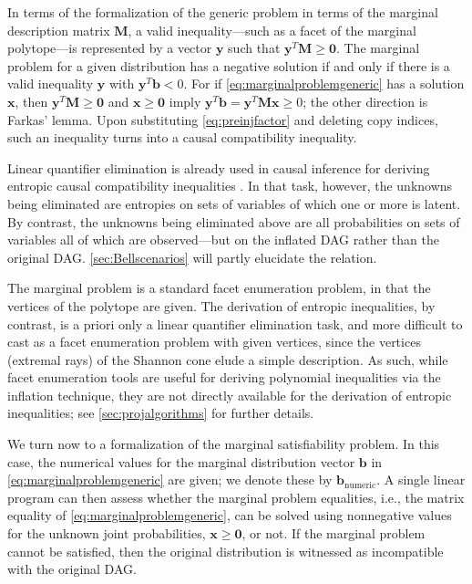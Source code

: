 \documentclass[aps,english,superscriptaddress,onecolumn,twoside,longbibliography,pra,floatfix,fleqn,nofootinbib]{revtex4-1}%
\theoremstyle{definition}
\begin{document}
\color{blue} In terms of the formalization of the generic problem in terms of the marginal description matrix $\bm{M}$,\color{black} 
a valid inequality---such as a facet of the marginal polytope---is represented by a vector $\bm{y}$ such that $\bm{y}^T\bm{M}\geq\bm{0}$. The marginal problem for a given distribution has a negative solution if and only if there is a valid inequality $\bm{y}$ with $\bm{y}^T\bm{b} < 0$. For if \cref{eq:marginalproblemgeneric} has a solution $\bm{x}$, then $\bm{y}^T\bm{M}\geq \bm{0}$ and $\bm{x}\geq \bm{0}$ imply $\bm{y}^T\bm{b} = \bm{y}^T\bm{M}\bm{x} \geq 0$; the other direction is Farkas' lemma. Upon substituting \cref{eq:preinjfactor} and deleting copy indices, such an inequality turns into a causal compatibility inequality.

Linear quantifier elimination is already used in causal inference for deriving entropic causal compatibility inequalities \cite{chaves2014novel,chaves2014informationinference}. In that task, however, the unknowns being eliminated are entropies on sets of variables of which one or more is latent. By contrast, the unknowns being eliminated above are all probabilities on sets of variables all of which are observed---but on the inflated DAG rather than the original DAG.
\cref{sec:Bellscenarios} will partly elucidate the relation.

The marginal problem is a standard facet enumeration problem, in that the vertices of the polytope are given. The derivation of entropic inequalities, by contrast, is a priori only a linear quantifier elimination task, and more difficult to cast as a facet enumeration problem with given vertices, since the vertices (extremal rays) of the Shannon cone elude a simple description. As such, while facet enumeration tools are useful for deriving polynomial inequalities via the inflation technique, they are not directly available for the derivation of entropic inequalities; see \cref{sec:projalgorithms} for further details.

\color{blue} We turn now to a formalization of the marginal satisfiability problem.  In this case, the numerical values for 
the marginal distribution vector $\bm{b}$ 
in \cref{eq:marginalproblemgeneric} are given; we denote these by $\bm{b}_{\text{numeric}}$. \color{black} A single linear program can then assess whether the marginal problem equalities, i.e., the matrix equality of \cref{eq:marginalproblemgeneric}, can be solved using nonnegative values for the unknown joint probabilities, $\bm{x} \geq \bm{0}$, or not. If the marginal problem cannot be satisfied, then the original distribution is witnessed as incompatible with the original DAG. 
\end{document}
